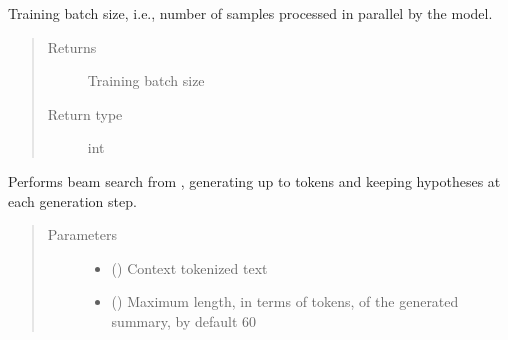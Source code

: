 \documentclass[letterpaper,10pt,english]{sphinxmanual}
\begin{document}
\begin{fulllineitems}
\begin{fulllineitems}
\label{\detokenize{code:gpt2_summarizer.GPT2Summarizer.batch_size}}
\sphinxAtStartPar
Training batch size, i.e., number of samples processed in parallel by
the model.
\begin{quote}\begin{description}
\item[{Returns}] \leavevmode
\sphinxAtStartPar
Training batch size

\item[{Return type}] \leavevmode
\sphinxAtStartPar
int

\end{description}\end{quote}

\end{fulllineitems}


\begin{fulllineitems}
\label{\detokenize{code:gpt2_summarizer.GPT2Summarizer.beam_search}}
\sphinxAtStartPar
Performs beam search from , generating up to  tokens and
keeping  hypotheses at each generation step.
\begin{quote}\begin{description}
\item[{Parameters}] \leavevmode\begin{itemize}
\item {} 
\sphinxAtStartPar
{} () \textendash{} Context tokenized text

\item {} 
\sphinxAtStartPar
{} (\sphinxstyleliteralemphasis{\sphinxupquote{, }}) \textendash{} Maximum length, in terms of tokens, of the generated summary, by default 60


\end{itemize}
\end{description}
\end{quote}
\end{fulllineitems}
\end{fulllineitems}
\end{document}
